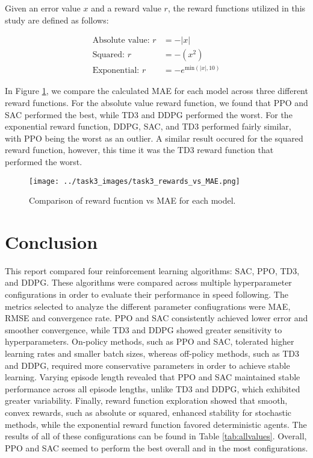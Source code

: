 \documentclass[11pt]{article}
\begin{document}
Given an error value $x$ and a reward value $r$, the reward functions utilized in this study are defined as follows:

\begin{align}
\text{Absolute value:  } r &= -|x| \\
\text{Squared: } r &= -(x^2) \\
\text{Exponential: } r &= -e^{\text{min}(|x|, 10)}
\end{align}

In Figure \ref{fig:reward_vs_mae}, we compare the calculated MAE for each model across three different reward functions. For the absolute value reward function, we found that PPO and SAC performed the best, while TD3 and DDPG performed the worst. For the exponential reward function, DDPG, SAC, and TD3 performed fairly similar, with PPO being the worst as an outlier. A similar result occured for the squared reward function, however, this time it was the TD3 reward function that performed the worst.

\begin{figure}[h!]
  \centering
  \texttt{[image: ../task3\_images/task3\_rewards\_vs\_MAE.png]}
  \caption{Comparison of reward fucntion vs MAE for each model.}
  \label{fig:reward_vs_mae}
\end{figure}

\newpage
\section{Conclusion}

This report compared four reinforcement learning algorithms: SAC, PPO, TD3, and DDPG. These algorithms were compared across multiple hyperparameter configurations in order to evaluate their performance in speed following. The metrics selected to analyze the different parameter confiugrations were MAE, RMSE and convergence rate. PPO and SAC consistently achieved lower error and smoother convergence, while TD3 and DDPG showed greater sensitivity to hyperparameters. On-policy methods, such as PPO and SAC, tolerated higher learning rates and smaller batch sizes, whereas off-policy methods, such as TD3 and DDPG, required more conservative parameters in order to achieve stable learning. Varying episode length revealed that PPO and SAC maintained stable performance across all episode lengths, unlike TD3 and DDPG, which exhibited greater variability. Finally, reward function exploration showed that smooth, convex rewards, such as absolute or squared, enhanced stability for stochastic methods, while the exponential reward function favored deterministic agents. The results of all of these configurations can be found in Table \ref{tab:allvalues}. Overall, PPO and SAC seemed to perform the best overall and in the most configurations.
\end{document}
